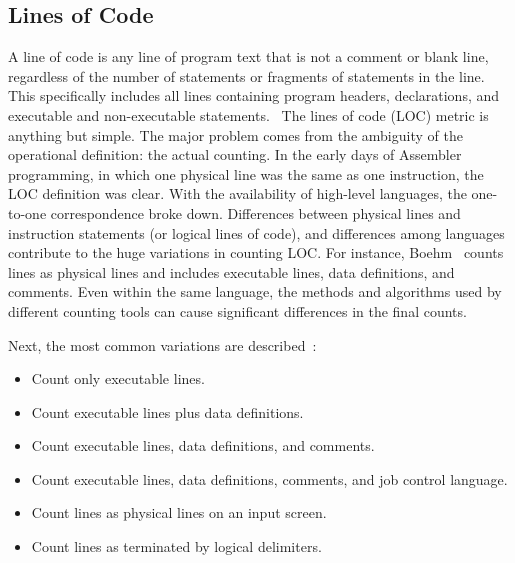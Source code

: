 \subsection{Lines of Code}
A line of code is any line of program text that is not a comment or blank line, 
regardless of the number of statements or fragments of statements in the line. 
This specifically includes all lines containing program headers, declarations, and executable and non-executable statements.~\cite{conte1986software}
The lines of code (LOC) metric is anything but simple. 
The major problem comes from the ambiguity of the operational definition: the actual counting.
In the early days of Assembler programming, in which one physical line was the same as one instruction, the LOC definition was clear.
With the availability of high-level languages, the one-to-one correspondence broke down.
Differences between physical lines and instruction statements (or logical lines of code), 
and differences among languages contribute to the huge variations in counting LOC.
For instance, Boehm~\cite{boehm2009software} counts lines as physical lines and includes executable lines, data definitions, and comments. 
Even within the same language, the methods and algorithms used by different counting tools can cause significant differences in the final counts.

Next, the most common variations are described~\cite{jones1986programming}: 
\begin{itemize}
\item Count only executable lines. 
\item Count executable lines plus data definitions. 
\item Count executable lines, data definitions, and comments. 
\item Count executable lines, data definitions, comments, and job control language. 
\item Count lines as physical lines on an input screen. 
\item Count lines as terminated by logical delimiters. 
\end{itemize}


